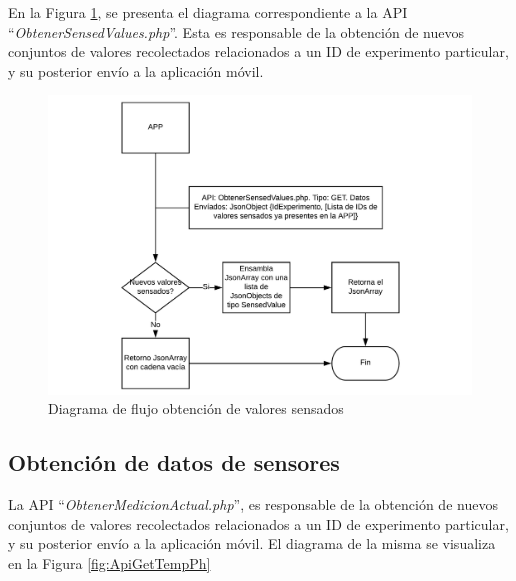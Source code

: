         \par En la Figura \ref{fig:ApiGet}, se presenta el diagrama correspondiente a la API ``\textit{ObtenerSensedValues.php}''. Esta es responsable de la obtención de nuevos conjuntos de valores recolectados relacionados a un ID de experimento particular, y su posterior envío a la aplicación móvil.
            \begin{figure}[h]
                \centering
                \includegraphics [scale=0.50] {DiagramaAPIGet.pdf}
                \caption{Diagrama de flujo obtención de valores sensados}
                \label{fig:ApiGet}
            \end{figure}
        
        \subsection{Obtención de datos de sensores}
        \par La API ``\textit{ObtenerMedicionActual.php}'', es responsable de la obtención de nuevos conjuntos de valores recolectados relacionados a un ID de experimento particular, y su posterior envío a la aplicación móvil. El diagrama de la misma se visualiza en la Figura \ref{fig:ApiGetTempPh}
        
